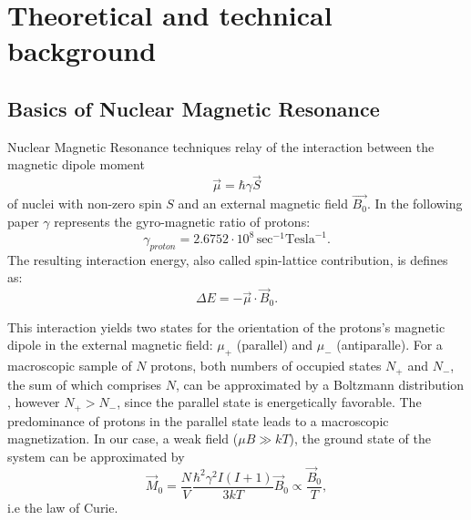 \section{Theoretical and technical background}
\subsection{Basics of Nuclear Magnetic Resonance}

Nuclear Magnetic Resonance techniques relay of the interaction between the magnetic dipole moment
\begin{equation}
\label{magnetic dipole moment}
\vec{\mu} = \hbar\gamma\vec{S} 
\end{equation}
 of nuclei with non-zero spin $S$ and an external magnetic field $\vec{B_0}$. In the following paper $\gamma$ represents the gyro-magnetic ratio of protons:
$$ \gamma_{proton} = 2.6752 \cdot 10^8 \, \textrm{sec}^{-1}\textrm{Tesla}^{-1}.
$$The resulting interaction energy, also called spin-lattice contribution, is defines as:
\begin{equation}
\label{interaction energy}
\Delta E = -\vec{\mu}\cdot\vec{B}_0.
\end{equation}

This interaction yields two states for the orientation of the protons's magnetic dipole in the external magnetic field: $\mu_+$ (parallel) and $\mu_-$ (antiparalle).
For a macroscopic sample of $N$ protons, both numbers of occupied states $N_+$ and $N_-$, the sum of which comprises $N$, can be approximated by a Boltzmann distribution
, however $N_+ > N_-$, since the parallel state is energetically favorable. The predominance of protons in the parallel state leads to a macroscopic magnetization.
In our case, a weak field ($\mu B \gg kT$), the ground state of the system can be approximated by
\begin{equation}
\label{ground state approx}
\vec{M}_0 = \frac{N}{V} \frac{\hbar^2 \gamma^2 I(I+1)}{3kT}\vec{B}_0 \propto \frac{\vec{B}_0}{T},
\end{equation}
i.e the law of Curie.

